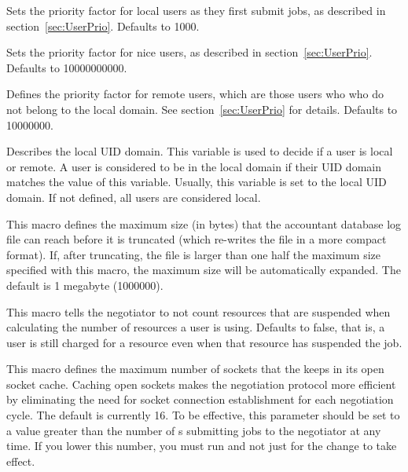 \begin{description}
\label{param:DefaultPrioFactor} 
\item[\Macro{DEFAULT\_PRIO\_FACTOR}]
  Sets the priority factor for local users as they first submit jobs,
  as described in section~\ref{sec:UserPrio}.
  Defaults to 1000.

\label{param:NiceUserPrioFactor} 
\item[\Macro{NICE\_USER\_PRIO\_FACTOR}]
  Sets the priority factor for nice users, as described in
  section~\ref{sec:UserPrio}.
  Defaults to 10000000000.

\label{param:RemotePrioFactor} 
\item[\Macro{REMOTE\_PRIO\_FACTOR}]
  Defines the priority factor for remote users,
  which are those users who who do not belong to the local domain.
  See section~\ref{sec:UserPrio} for details.  
  Defaults to 10000000.

\label{param:AccountantLocalDomain} 
\item[\Macro{ACCOUNTANT\_LOCAL\_DOMAIN}]
  Describes the local UID domain.
  This variable is used to decide if a user is local or remote. 
  A user is considered to be in the local domain if their UID domain matches
  the value of this variable. Usually, this variable is set
  to the local UID domain. 
  If not defined, all users are considered local.

\label{param:MaxAccountantDatabaseSize}
\item[\Macro{MAX\_ACCOUNTANT\_DATABASE\_SIZE}] 
  This macro defines the maximum size (in bytes) that the accountant
  database log file can reach before it is truncated (which re-writes
  the file in a more compact format).
  If, after truncating, the file is larger than one half the maximum
  size specified with this macro, the maximum size will be
  automatically expanded.
  The default is 1 megabyte (1000000).

\label{param:NegotiatorDiscountSuspendedResources} 
\item[\Macro{NEGOTIATOR\_DISCOUNT\_SUSPENDED\_RESOURCES}]
   This macro tells the negotiator to not count resources that are suspended
   when calculating the number of resources a user is using. 
   Defaults to false, that is, a user is still charged for a resource even
   when that resource has suspended the job.

\label{param:NegotiatorSocketCacheSize}
\item[\Macro{NEGOTIATOR\_SOCKET\_CACHE\_SIZE}]
  This macro defines the maximum number of sockets that the 
  keeps in its open socket cache.
  Caching open sockets makes the negotiation
  protocol more efficient by eliminating the need for socket
  connection establishment for each negotiation cycle.  The default is
  currently 16.  To be effective, this parameter should be set to a
  value greater than the number of s submitting jobs to the
  negotiator at any time.  If you lower this number, you must run
   and not just  for the change to
  take effect.


\end{description}
